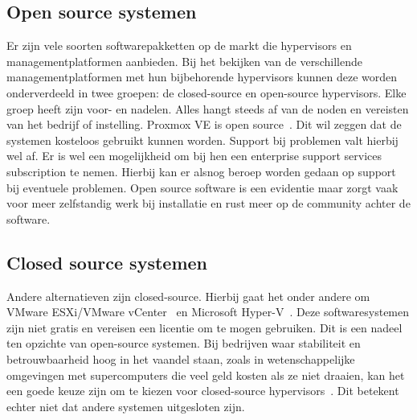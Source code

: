 \subsection{Open source systemen}\label{subsec:opensource}
Er zijn vele soorten softwarepakketten op de markt die hypervisors en managementplatformen aanbieden. Bij het bekijken van de verschillende managementplatformen met hun bijbehorende hypervisors kunnen deze worden onderverdeeld in twee groepen: de closed-source en open-source hypervisors. Elke groep heeft zijn voor- en nadelen. Alles hangt steeds af van de noden en vereisten van het bedrijf of instelling.
Proxmox VE is open source~\autocite{Proxmox}. Dit wil zeggen dat de systemen kosteloos gebruikt kunnen worden. Support bij problemen valt hierbij wel af. Er is wel een mogelijkheid om bij hen een enterprise support services subscription te nemen. Hierbij kan er alsnog beroep worden gedaan op support bij eventuele problemen.
Open source software is een evidentie maar zorgt vaak voor meer zelfstandig werk bij installatie en rust meer op de community achter de software.

\subsection{Closed source systemen}\label{subsec:clousedsource}
Andere alternatieven zijn closed-source. Hierbij gaat het onder andere om VMware ESXi/VMware vCenter~\autocite{vmware} en Microsoft Hyper-V~\autocite{Eaton2019}. Deze softwaresystemen zijn niet gratis en vereisen een licentie om te mogen gebruiken. Dit is een nadeel ten opzichte van open-source systemen.
Bij bedrijven waar stabiliteit en betrouwbaarheid hoog in het vaandel staan, zoals in wetenschappelijke omgevingen met supercomputers die veel geld kosten als ze niet draaien, kan het een goede keuze zijn om te kiezen voor closed-source hypervisors~\autocite{voras2012early}. Dit betekent echter niet dat andere systemen uitgesloten zijn.

